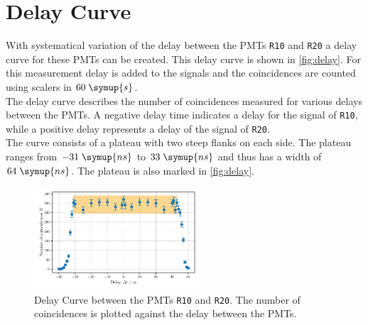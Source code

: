 \section{Delay Curve}
With systematical variation of the delay between the PMTs \texttt{R10} and \texttt{R20} a delay 
curve for these PMTs can be created. This delay curve is shown in \autoref{fig:delay}.
For this measurement delay is added to the signals and the coincidences are counted using scalers in 
$60 \; \symup{s}$. \\
The delay curve describes the number of coincidences measured for various delays between the PMTs.
A negative delay time indicates a delay for the signal of \texttt{R10}, while a positive delay 
represents a delay of the signal of \texttt{R20}. \\
The curve consists of a plateau with two steep flanks on each side. The plateau ranges from $-31 \; \symup{ns}$ to 
$33 \; \symup{ns}$ and thus has a width of $64 \; \symup{ns}$. The plateau is also marked in \autoref{fig:delay}.
\begin{figure}
    \centering
    \includegraphics[width=0.55\textwidth]{plots/delay.pdf}
    \caption{Delay Curve between the PMTs \texttt{R10} and \texttt{R20}. The number of coincidences is plotted against the delay between the PMTs.}
    \label{fig:delay}
\end{figure}

